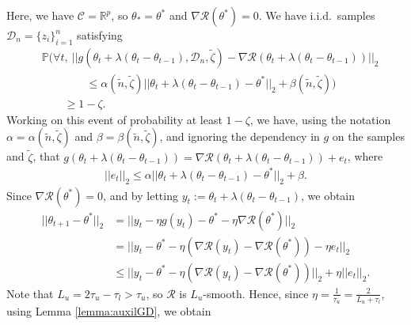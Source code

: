 \documentclass{article}
\newcommand{\iid}{i.i.d.{\ }}
\begin{document}
Here, we have $\mathcal{C} = \mathbb{R}^p$, so $\theta_{*} = \theta^*$ and $\nabla\mathcal{R}(\theta^*) = 0$. We have \iid samples $\mathcal{D}_n = \{z_i\}_{i = 1}^n$ satisfying
\begin{align*}
&\mathbb{P}\Bigg(\forall t, \ ||g(\theta_t + \lambda(\theta_t - \theta_{t - 1}), \mathcal{D}_n, \widetilde{\zeta}) - \nabla\mathcal{R}(\theta_t + \lambda(\theta_t - \theta_{t - 1}))||_2\\
&\qquad \qquad \leq \alpha(\widetilde{n}, \widetilde{\zeta})||\theta_t + \lambda(\theta_t - \theta_{t - 1}) - \theta^*||_2 + \beta(\widetilde{n}, \widetilde{\zeta})\Bigg) \\
%
& \qquad \geq 1 - \zeta.
\end{align*}
Working on this event of probability at least $1 - \zeta$, we have, using the notation $\alpha = \alpha(\widetilde{n}, \widetilde{\zeta})$ and $\beta = \beta(\widetilde{n}, \widetilde{\zeta})$, and ignoring the dependency in $g$ on the samples and $\widetilde{\zeta}$, that $g(\theta_t + \lambda(\theta_t - \theta_{t - 1})) = \nabla\mathcal{R}(\theta_t + \lambda(\theta_t - \theta_{t - 1})) + e_t$, where
\begin{align*}
||e_t||_2 \leq \alpha||\theta_t + \lambda(\theta_t - \theta_{t - 1}) - \theta^*||_2 + \beta.
\end{align*}
Since $\nabla\mathcal{R}(\theta^*) = 0$, and by letting $y_t := \theta_t + \lambda(\theta_t - \theta_{t - 1 })$, we obtain
\begin{align*}
||\theta_{t + 1} - \theta^*||_2 &= ||y_t - \eta g(y_t)- \theta^* - \eta \nabla\mathcal{R}(\theta^*)||_2\\
&= ||y_t - \theta^* -\eta(\nabla\mathcal{R}(y_t) - \nabla\mathcal{R}(\theta^*)) - \eta e_t||_2\\
&\leq ||y_t - \theta^* - \eta(\nabla\mathcal{R}(y_t) - \nabla\mathcal{R}(\theta^*))||_2 + \eta||e_t||_2.
\end{align*}
Note that $L_u = 2\tau_u - \tau_l > \tau_u$, so $\mathcal{R}$ is $L_u$-smooth. Hence, since $\eta = \frac{1}{\tau_u} = \frac{2}{L_u + \tau_l}$, using Lemma \ref{lemma:auxilGD}, we obtain
\end{document}
